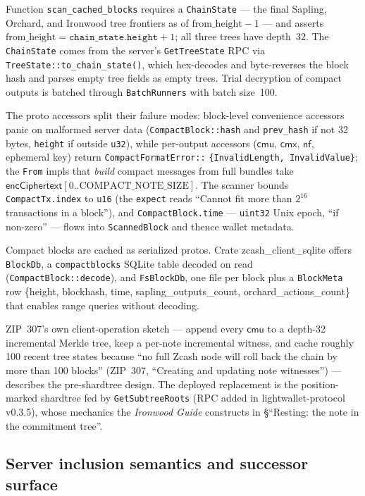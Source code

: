 \documentclass[11pt,a4paper]{article}
\theoremstyle{definition}
\newcommand{\nfsym}{\mathsf{nf}}
\newcommand{\cmx}{\mathsf{cmx}}
\begin{document}
Function \texttt{scan\_cached\_blocks} requires a \texttt{ChainState} ---
the final Sapling, Orchard, and Ironwood tree frontiers as of
$\mathrm{from\_height} - 1$ --- and asserts $\mathrm{from\_height} =
\texttt{chain\_state.height} + 1$; all three trees have depth~32.
The \texttt{ChainState} comes from the server's
\texttt{GetTreeState} RPC via \texttt{TreeState::to\_chain\_state()}, which
hex-decodes and byte-reverses the block hash and parses empty tree fields as
empty trees. Trial decryption of
compact outputs is batched through \texttt{BatchRunners} with batch
size~100.

The proto accessors split their failure modes: block-level convenience
accessors panic on malformed server data (\texttt{CompactBlock::hash} and
\texttt{prev\_hash} if not 32 bytes, \texttt{height} if outside
\texttt{u32}), while per-output accessors ($\mathsf{cmu}$, $\cmx$,
$\nfsym$, ephemeral key) return
\texttt{CompactFormatError::}\allowbreak%
\texttt{\{InvalidLength, InvalidValue\}}; the
\texttt{From} impls that \emph{build} compact messages from full bundles
take $\mathsf{encCiphertext}[0..\mathrm{COMPACT\_NOTE\_SIZE}]$.
The scanner bounds \texttt{CompactTx.index} to \texttt{u16} (the
\texttt{expect} reads ``Cannot fit more than $2^{16}$ transactions in a
block''), and \texttt{CompactBlock.time} --- \texttt{uint32} Unix epoch,
``if non-zero'' --- flows into \texttt{ScannedBlock} and thence wallet
metadata.

Compact blocks are cached as serialized protos. Crate
\textsf{zcash\_client\_sqlite} offers \texttt{BlockDb}, a
\texttt{compactblocks} SQLite table decoded on read
(\texttt{CompactBlock::decode}), and \texttt{FsBlockDb}, one file per block
plus a \texttt{BlockMeta} row \{height, blockhash, time,
sapling\_outputs\_count, orchard\_actions\_count\} that enables range
queries without decoding.

ZIP~307's own client-operation sketch --- append every $\mathsf{cmu}$ to a
depth-32 incremental Merkle tree, keep a per-note incremental witness, and
cache roughly 100 recent tree states because ``no full Zcash node will roll
back the chain by more than 100 blocks'' (ZIP~307, ``Creating and updating
note witnesses'') --- describes the pre-shardtree design. The deployed
replacement is the position-marked shardtree fed by \texttt{GetSubtreeRoots}
(RPC added in \textsf{lightwallet-protocol} v0.3.5), whose
mechanics the \emph{Ironwood Guide} constructs in \S``Resting: the note in the
commitment tree''.

\subsection{Server inclusion semantics and successor surface}%
\label{sec:sync-compact-servers}
\end{document}

